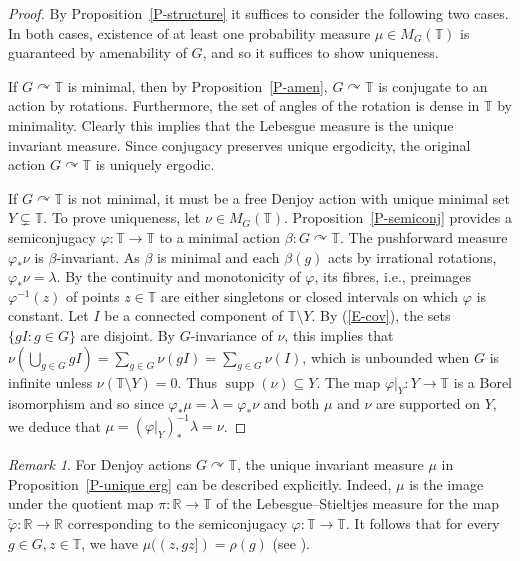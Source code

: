 \documentclass[11pt,a4paper,leqno]{amsart}
\theoremstyle{definition}
\theoremstyle{remark}
\newtheorem{rem}[thm]{Remark}
\numberwithin{equation}{section}
\theoremstyle{plain}
\DeclareMathOperator{\supp}{supp}
\newcommand{\Tb}{\mathbb{T}}
\newcommand{\Rb}{\mathbb{R}}
\begin{document}
\begin{proof}
    By Proposition~\ref{P-structure} it suffices to consider the following two cases. In both cases, existence of at least one probability measure $\mu \in M_G(\Tb)$ is guaranteed by amenability of $G$, and so it suffices to show uniqueness. 
    
    If $G\curvearrowright \Tb$ is minimal, then by Proposition~\ref{P-amen}, $G\curvearrowright \Tb$ is conjugate to an action by rotations. Furthermore, the set of angles of the rotation is dense in $\Tb$ by minimality. Clearly this implies that the Lebesgue measure is the unique invariant measure. Since conjugacy preserves unique ergodicity, the original action $G\curvearrowright \Tb$ is uniquely ergodic. 

    If $G\curvearrowright \Tb$ is not minimal, it must be a free Denjoy action with unique minimal set $Y\subsetneq \Tb$. To prove uniqueness, let $\nu\in M_G(\Tb)$. Proposition~\ref{P-semiconj} provides a semiconjugacy $\varphi : \Tb \to \Tb$ to a minimal action $\beta : G\curvearrowright \Tb$. The pushforward measure $\varphi_*\nu$ is $\beta$-invariant. As $\beta$ is minimal and each $\beta(g)$ acts by irrational rotations, $\varphi_*\nu = \lambda$. By the continuity and monotonicity of $\varphi$, its fibres, i.e., preimages $\varphi^{-1}(z)$ of points $z\in \Tb$ are either singletons or closed intervals on which $\varphi$ is constant. Let $I$ be a connected component of $\Tb\setminus Y$. By (\ref{E-cov}), the sets $\{gI : g\in G\}$ are disjoint. By $G$-invariance of $\nu$, this implies that $\nu(\bigcup_{g\in G} gI) = \sum_{g\in G} \nu(gI) = \sum_{g\in G} \nu(I)$, which is unbounded when $G$ is infinite unless $\nu(\Tb\setminus Y) = 0$. Thus $\supp(\nu) \subseteq Y$. The map $\varphi|_Y : Y\to\Tb$ is a Borel isomorphism and so since $\varphi_*\mu = \lambda = \varphi_*\nu$ and both $\mu$ and $\nu$ are supported on $Y$, we deduce that $\mu = (\varphi|_Y)_*^{-1}\lambda = \nu$. 
\end{proof}

\begin{rem}\label{R-meas}
	For Denjoy actions $G\curvearrowright \mathbb{T}$, the unique invariant measure $\mu$ in Proposition~\ref{P-unique erg} can be described explicitly. Indeed, $\mu$ is the image under the quotient map $\pi : \Rb \to \Tb$ of the Lebesgue--Stieltjes measure for the map $\tilde{\varphi} : \mathbb{R} \to \mathbb{R}$ corresponding to the semiconjugacy $\varphi : \Tb \to \Tb$. It follows that for every $g\in G,z\in \Tb$, we have $\mu((z,gz]) = \rho(g)$ (see \cite[Theorem 2.2.10]{Nav11}).   
\end{rem}
\end{document}
